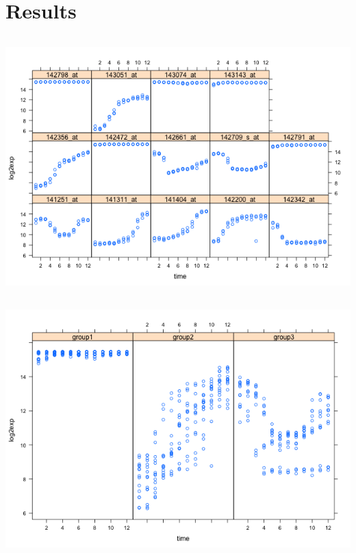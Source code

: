 \documentclass[12pt,letterpaper]{article}\usepackage[]{graphicx}\usepackage[]{color}
\begin{document}
\newpage
\section{Results}
\includegraphics[height=10cm, keepaspectratio]
  {genes-groupshrink-xyplot-gene.png}\\
\includegraphics[height=10cm, keepaspectratio]
  {genes-groupshrink-xyplot-group.png}\\
\end{document}
